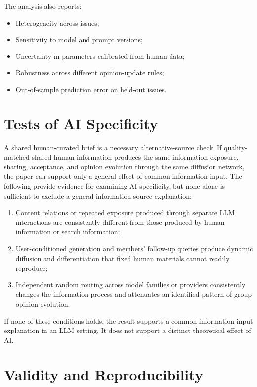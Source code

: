 \documentclass[11pt,a4paper]{article}
\begin{document}
The analysis also reports:

\begin{itemize}
\item Heterogeneity across issues;
\item Sensitivity to model and prompt versions;
\item Uncertainty in parameters calibrated from human data;
\item Robustness across different opinion-update rules;
\item Out-of-sample prediction error on held-out issues.
\end{itemize}

\section{Tests of AI Specificity}

A shared human-curated brief is a necessary alternative-source check. If quality-matched shared human information produces the same information exposure, sharing, acceptance, and opinion evolution through the same diffusion network, the paper can support only a general effect of common information input. The following provide evidence for examining AI specificity, but none alone is sufficient to exclude a general information-source explanation:

\begin{enumerate}
\item Content relations or repeated exposure produced through separate LLM interactions are consistently different from those produced by human information or search information;
\item User-conditioned generation and members' follow-up queries produce dynamic diffusion and differentiation that fixed human materials cannot readily reproduce;
\item Independent random routing across model families or providers consistently changes the information process and attenuates an identified pattern of group opinion evolution.
\end{enumerate}

If none of these conditions holds, the result supports a common-information-input explanation in an LLM setting. It does not support a distinct theoretical effect of AI.

\section{Validity and Reproducibility}
\end{document}
